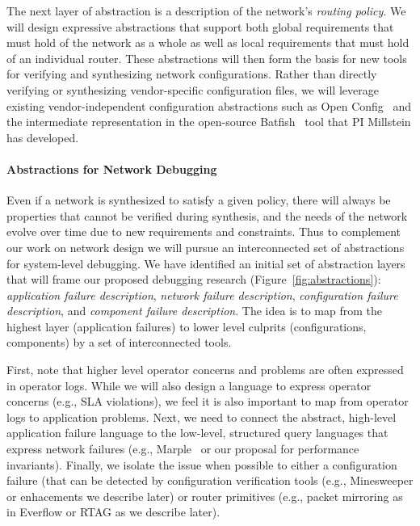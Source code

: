 
The next layer of abstraction is a description of the network's {\em routing policy}.  We will design expressive abstractions that support both global requirements that must hold of the network as a whole as well as local requirements that must hold of an individual router.  These abstractions will then form the basis for new tools for verifying and synthesizing network configurations.  Rather than directly verifying or synthesizing vendor-specific configuration files, we will leverage existing vendor-independent configuration abstractions such as 
Open Config~\cite{openconfig} and the intermediate representation in the open-source Batfish~\cite{batfish} tool that PI Millstein has developed.  

\paragraph{Abstractions for Network Debugging}  Even if a network is synthesized to satisfy a given policy, there will always be properties that cannot be verified during synthesis, and the needs of the network evolve over time due to new requirements and constraints.  Thus to complement our work on network design we will pursue an interconnected set of abstractions for system-level debugging.
We have identified an initial set of abstraction layers that will frame our proposed debugging research
(Figure~\ref{fig:abstractions}): {\em application failure description}, {\em network failure description},  
{\em configuration failure description}, and {\em component failure description}.  The idea is to map 
from the highest layer (application failures) to lower level culprits (configurations, components) by a set
of interconnected tools.

First, note that higher level operator concerns and problems are often expressed in operator logs.  While
we will also design a language to express operator concerns (e.g., SLA violations), we feel it is also
important to map from operator logs to application problems.
Next, we need to connect the abstract, high-level application failure language to the
low-level, structured query languages that express network failures (e.g., Marple~\cite{marple} or 
our proposal for  performance invariants).  Finally, we isolate the issue when possible to 
either a configuration failure (that can be detected by configuration verification tools (e.g., Minesweeper\cite{minesweeper} or enhacements we describe later) or router primitives (e.g., packet mirroring as in
Everflow or RTAG as we describe later).

